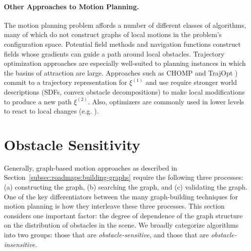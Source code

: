 
\paragraph{Other Approaches to Motion Planning.}
The motion planning problem affords a number of different classes of
algorithms,
many of which do not construct graphs of local motions in the
problem's configuration space.
Potential field methods \citep{khatib1986potentialfields}
and navigation functions \citep{rimon1989navigationfunctions}
construct fields whose gradients can guide a path around
local obstacles.
Trajectory optimization approaches are especially well-suited to
planning instances in which the basins of attraction are large.
Approaches such as CHOMP \citep{zucker2013chomp}
and TrajOpt \citep{schulman2013trajopt})
commit to a trajectory representation for $\xi^{(1)}$
and use require stronger world descriptions
(SDFs, convex obstacle decompositions)
to make local modifications
to produce a new path $\xi^{(2)}$.
Also,
optimizers are commonly used in lower levels to react to local
changes (e.g. \citep{quinlan1994modification}).

\section{Obstacle Sensitivity}
\label{sec:roadmaps:sensitivity}

Generally,
graph-based motion approaches as described
in Section~\ref{subsec:roadmaps:building-graphs}
require the following three processes:
(a) constructing the graph,
(b) searching the graph, and
(c) validating the graph.
One of the key differentiators between the many graph-building
techniques for motion planning
is how they interleave these three processes.
This section considers one important factor:
the degree of dependence of the graph structure
on the distribution of obstacles in the scene.
We broadly categorize algorithms into two groups:
those that are \emph{obstacle-sensitive},
and those that are \emph{obstacle-insensitive}.

